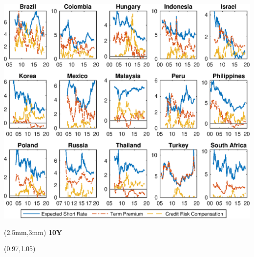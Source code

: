 \documentclass[12pt, aspectratio=169, xcolor=dvipsnames]{beamer}
\begin{document}
\begin{frame}[label=YldDcmp10]
\begin{center}							%
	\includegraphics[trim={0cm 0cm 0cm 0cm},clip,height=0.95\textheight,width=\linewidth]{../Figures/Estimation/ny_dcmp.eps} \\
\end{center}
\begin{textblock*}{15cm}(2.5mm,3mm)
	\textbf{10Y}
\end{textblock*}
\begin{textblock*}{5cm}(0.97\textwidth,1.05\textheight)
	\hyperlink{YldDcmp2}{}
\end{textblock*}
\end{frame}
\end{document}
